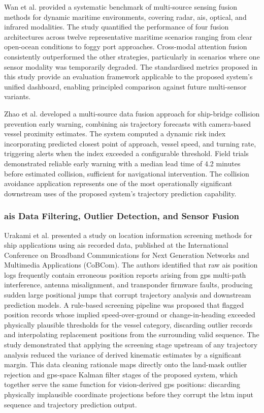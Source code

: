 Wan et al. \cite{Wan2025} provided a systematic benchmark of multi-source sensing
fusion methods for dynamic maritime environments, covering radar, \gls{ais}, optical, and
infrared modalities. The study quantified the performance of four fusion architectures
across twelve representative maritime scenarios ranging from clear open-ocean
conditions to foggy port approaches. Cross-modal attention fusion consistently
outperformed the other strategies, particularly in scenarios where one sensor
modality was temporarily degraded. The standardised metrics proposed in this study
provide an evaluation framework applicable to the proposed system's unified
dashboard, enabling principled comparison against future multi-sensor variants.
 
Zhao et al. \cite{Zhao2024} developed a multi-source data fusion approach for
ship-bridge collision prevention early warning, combining \gls{ais} trajectory forecasts
with camera-based vessel proximity estimates. The system computed a dynamic risk
index incorporating predicted closest point of approach, vessel speed, and turning
rate, triggering alerts when the index exceeded a configurable threshold. Field
trials demonstrated reliable early warning with a median lead time of 4.2 minutes
before estimated collision, sufficient for navigational intervention. The collision
avoidance application represents one of the most operationally significant downstream
uses of the proposed system's trajectory prediction capability.

\subsubsection{\textbf{\gls{ais} Data Filtering, Outlier Detection, and Sensor Fusion}}

Urakami et al. \cite{Urakami2018} presented a study on location information
screening methods for ship applications using \gls{ais} recorded data, published at the
International Conference on Broadband Communications for Next Generation Networks
and Multimedia Applications (CoBCom). The authors identified that raw \gls{ais} position
logs frequently contain erroneous position reports arising from \gls{gps} multi-path
interference, antenna misalignment, and transponder firmware faults, producing
sudden large positional jumps that corrupt trajectory analysis and downstream
prediction models. A rule-based screening pipeline was proposed that flagged
position records whose implied speed-over-ground or change-in-heading exceeded
physically plausible thresholds for the vessel category, discarding outlier records
and interpolating replacement positions from the surrounding valid sequence. The
study demonstrated that applying the screening stage upstream of any trajectory
analysis reduced the variance of derived kinematic estimates by a significant
margin. This data cleaning rationale maps directly onto the land-mask outlier
rejection and \gls{gps}-space Kalman filter stages of the proposed system, which together
serve the same function for vision-derived \gls{gps} positions: discarding physically
implausible coordinate projections before they corrupt the \gls{lstm} input sequence
and trajectory prediction output.

